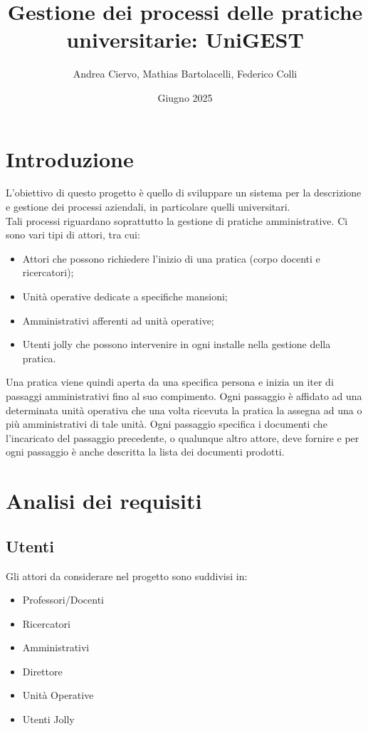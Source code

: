 \documentclass{article}
\title{Gestione dei processi delle pratiche universitarie: UniGEST}
\author{Andrea Ciervo, Mathias Bartolacelli, Federico Colli}
\date{Giugno 2025}
\begin{document}
\maketitle
\tableofcontents
\section{Introduzione}
L'obiettivo di questo progetto è quello di sviluppare un sistema per la descrizione e gestione dei processi aziendali, in particolare quelli universitari.\\
Tali processi riguardano soprattutto la gestione di pratiche amministrative.
Ci sono vari tipi di attori, tra cui:
\begin{itemize}
    \item Attori che possono richiedere l’inizio di una pratica (corpo docenti e ricercatori);
    \item Unità operative dedicate a specifiche mansioni;
    \item Amministrativi afferenti ad unità operative;
    \item Utenti jolly che possono intervenire in ogni installe nella gestione della pratica.
\end{itemize}
Una pratica viene quindi aperta da una specifica persona e inizia un iter di passaggi amministrativi fino al suo compimento. Ogni passaggio è affidato ad una determinata unità operativa che una volta ricevuta la pratica la assegna ad una o più amministrativi di tale unità.
Ogni passaggio specifica i documenti che l’incaricato del passaggio precedente, o qualunque altro attore, deve fornire e per ogni passaggio è anche descritta la lista dei documenti prodotti.

\section{Analisi dei requisiti}
\subsection{Utenti}
Gli attori da considerare nel progetto sono suddivisi in:
\begin{itemize}
    \item Professori/Docenti
    \item Ricercatori
    \item Amministrativi
    \item Direttore
    \item Unità Operative
    \item Utenti Jolly
\end{itemize}
\end{document}

